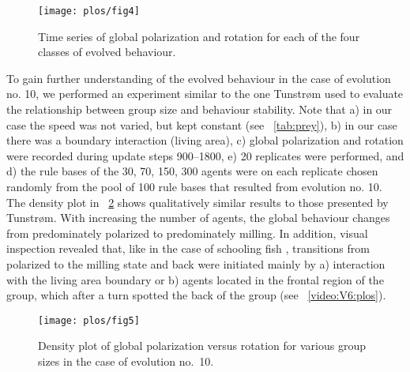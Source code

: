 \begin{figure}
	\texttt{[image: plos/fig4]}
	\caption{Time series of global polarization and rotation for each of the four classes of evolved behaviour.}		 
	\label{fig4}
\end{figure}
To gain further understanding of the evolved behaviour in the case of evolution no. 10, we performed an experiment similar to the one Tunstrøm\etal \cite[\figurename~3]{tunstrom2013collective} used to evaluate the relationship between group size and behaviour stability. Note that a) in our case the speed was not varied, but kept constant (see \tablename~\ref{tab:prey}), b) in our case there was a boundary interaction (living area), c) global polarization and rotation were recorded during update steps \numrange{900}{1800}, e) 20 replicates were performed, and d) the rule bases of the 30, 70, 150, 300 agents were on each replicate chosen randomly from the pool of 100 rule bases that resulted from evolution no. 10. The density plot in \figurename~\ref{fig5} shows qualitatively similar results to those presented by Tunstrøm\etal \cite[\figurename~2]{tunstrom2013collective}. With increasing the number of agents, the global behaviour changes from predominately polarized to predominately milling. In addition, visual inspection revealed that, like in the case of schooling fish \cite[\figurename~6]{tunstrom2013collective}, transitions from polarized to the milling state and back were initiated mainly by a) interaction with the living area boundary or b) agents located in the frontal region of the group, which after a turn spotted the back of the group (see \videoname~\ref{video:V6:plos}). 

\begin{figure}
	\texttt{[image: plos/fig5]}
	\caption{Density plot of global polarization versus rotation for various group sizes in the case of evolution no.~10.}
	\label{fig5}
\end{figure}

